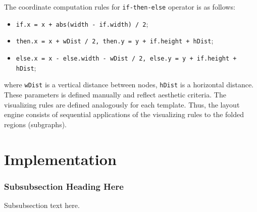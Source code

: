 \documentclass[conference]{IEEEtran}
\begin{document}
The coordinate computation rules for \texttt{if-then-else} operator is as follows:
\begin{itemize}
\item \texttt{if.x = x + abs(width - if.width) / 2};
\item \texttt{then.x = x  + wDist / 2, then.y = y + if.height + hDist};
\item \texttt{else.x = x - else.width - wDist / 2, else.y = y + if.height + hDist};
\end{itemize}
where \texttt{wDist} is a vertical distance between nodes, \texttt{hDist} is a horizontal distance.  These parameters is defined manually and reflect aesthetic criteria.  The visualizing rules are defined analogously for each template.  Thus, the layout engine consists of sequential applications of the visualizing rules to the folded regions (subgraphs).

\section{Implementation}
\label{sec:implementation}



\subsubsection{Subsubsection Heading Here}
Subsubsection text here.




%
%
\end{document}
